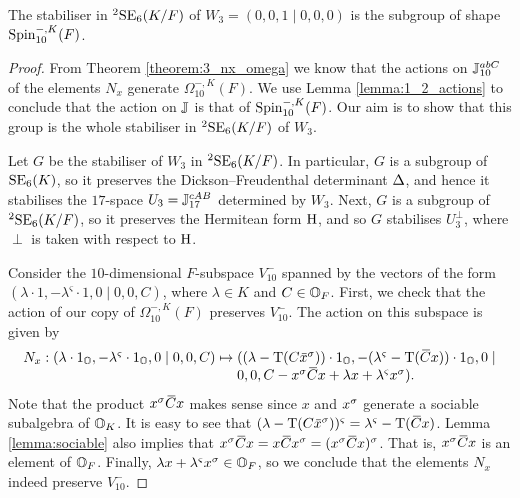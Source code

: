 \begin{theorem}
	The stabiliser in ${}^2\mathrm{SE}_6(K/F)$ of $W_3 = (0,0,1\mid 0,0,0)$ 
	is the subgroup of shape $\mathrm{Spin}_{10}^{-,K}(F)$. 
\end{theorem}

\begin{proof}
	From Theorem \ref{theorem:3_nx_omega} we know that the actions on $\mathbb{J}_{10}^{abC}$
	of the elements $N_x$ generate $\Omega_{10}^{-,K}(F)$. We use 
	Lemma \ref{lemma:1_2_actions} to conclude that the action on $\mathbb{J}$ is that of
	$\mathrm{Spin}_{10}^{-,K}(F)$. Our aim is to show that this group is the whole stabiliser
	in ${}^2\mathrm{SE}_6(K/F)$ of $W_3$.
	
	Let $G$ be the stabiliser of $W_3$ in ${}^2\mathrm{SE}_6(K/F)$. In particular, $G$ is 
	a subgroup of $\mathrm{SE}_6(K)$, so it preserves the Dickson--Freudenthal determinant
	$\Delta$, and hence it stabilises the $17$-space $U_3 = \mathbb{J}_{17}^{cAB}$ 
	determined by $W_3$. Next, $G$
	is a subgroup of ${}^2\mathrm{SE}_6(K/F)$, so it preserves the Hermitean form $\mathrm{H}$,
	and so $G$ stabilises $U_3^{\perp}$, where $\perp$ is taken with respect to $\mathrm{H}$. 
	
	Consider the $10$-dimensional $F$-subspace $V_{10}^-$ spanned by the vectors 
	of the form $(\lambda\cdot 1, -\lambda^{\varsigma}\cdot 1, 
	0 \mid 0,0,C)$, where $\lambda \in K$ and 
	$C \in \mathbb{O}_F$. First, we check that the action of our copy of $\Omega_{10}^{-,K}(F)$ 
	preserves $V_{10}^-$. The action on this subspace is given by
	\begin{equation*}
		\begin{array}{r@{\;}c@{\;}l}
			N_x: (\lambda\cdot 1_{\O}, -\lambda^{\varsigma} \cdot 1_{\O}, 0 \mid 0,0, C) & \mapsto & 
				((\lambda - \Tr(C \ovx^{\s}))\cdot 1_{\O}, 
				-(\lambda^{\varsigma} -\Tr(\ovC x))\cdot 1_{\O}, 
				0 \mid \\
		& &					0,0, C - x^{\s} \ovC x + \lambda x + \lambda^{\varsigma} x^{\s}).
		\end{array}
	\end{equation*}
	Note that the product $x^{\sigma} \mathord{\mbox{\hspace*{0pt}}\,\overline{\!C\!\!\;}\!\:}\mbox{\hspace*{0pt}} x$ makes sense since $x$ and $x^{\sigma}$ generate a
	sociable subalgebra of $\mathbb{O}_K$. It is easy to see that 
	$(\lambda - \Tr(C\ovx^{\s}))^{\varsigma} = 
	\lambda^{\varsigma} - \Tr(\ovC x)$. Lemma \ref{lemma:sociable} also implies that 
	$x^{\s} \ovC x = x \ovC x^{\s} = (x^{\s} \ovC x)^{\s}$. That is, $x^{\sigma} \mathord{\mbox{\hspace*{0pt}}\,\overline{\!C\!\!\;}\!\:}\mbox{\hspace*{0pt}} x$ is an 
    element of $\mathbb{O}_F$. Finally, $\lambda x +  \lambda^{\varsigma} x^{\sigma} \in \mathbb{O}_F$, 
    so we conclude that 
    the elements $N_x$ indeed preserve $V_{10}^{-}$.
    

\end{proof}
